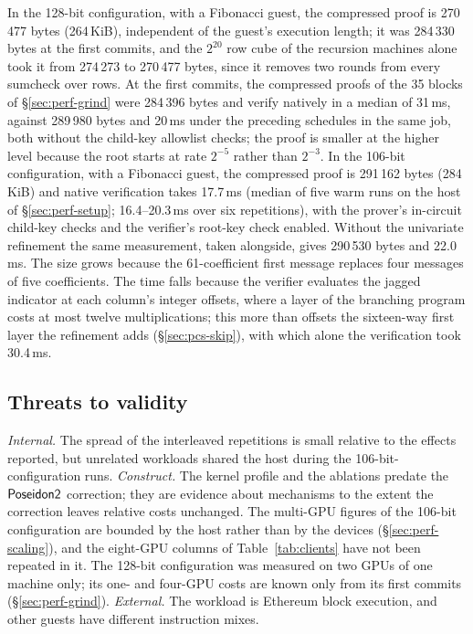 In the 128-bit configuration, with a Fibonacci guest, the compressed proof is 270\,477 bytes (264\,KiB), independent of the guest's execution length; it was 284\,330 bytes at the first commits, and the $2^{20}$ row cube of the recursion machines alone took it from 274\,273 to 270\,477 bytes, since it removes two rounds from every sumcheck over rows. At the first commits, the compressed proofs of the 35 blocks of \S\ref{sec:perf-grind} were 284\,396 bytes and verify natively in a median of 31\,ms, against 289\,980 bytes and 20\,ms under the preceding schedules in the same job, both without the child-key allowlist checks; the proof is smaller at the higher level because the root starts at rate $2^{-5}$ rather than $2^{-3}$. In the 106-bit configuration, with a Fibonacci guest, the compressed proof is 291\,162 bytes (284\,KiB) and native verification takes 17.7\,ms (median of five warm runs on the host of \S\ref{sec:perf-setup}; 16.4--20.3\,ms over six repetitions), with the prover's in-circuit child-key checks and the verifier's root-key check enabled. Without the univariate refinement the same measurement, taken alongside, gives 290\,530 bytes and 22.0\,ms. The size grows because the 61-coefficient first message replaces four messages of five coefficients. The time falls because the verifier evaluates the jagged indicator at each column's integer offsets, where a layer of the branching program costs at most twelve multiplications; this more than offsets the sixteen-way first layer the refinement adds (\S\ref{sec:pcs-skip}), with which alone the verification took 30.4\,ms.

\subsection{Threats to validity}
\label{sec:perf-threats}

\emph{Internal.} The spread of the interleaved repetitions is small relative to the effects reported, but unrelated workloads shared the host during the 106-bit-configuration runs. \emph{Construct.} The kernel profile and the ablations predate the $\mathsf{Poseidon2}{}$ correction; they are evidence about mechanisms to the extent the correction leaves relative costs unchanged. The multi-GPU figures of the 106-bit configuration are bounded by the host rather than by the devices (\S\ref{sec:perf-scaling}), and the eight-GPU columns of Table~\ref{tab:clients} have not been repeated in it. The 128-bit configuration was measured on two GPUs of one machine only; its one- and four-GPU costs are known only from its first commits (\S\ref{sec:perf-grind}). \emph{External.} The workload is Ethereum block execution, and other guests have different instruction mixes.
